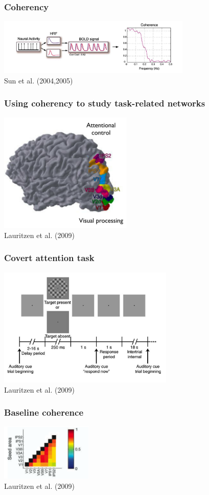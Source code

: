 \documentclass{beamer}
\begin{document}
\begin{frame}
\frametitle{Coherency}
\includegraphics[height=2.7cm]{figures/tseries_w_hemo_w_coh}
\\
\hfill
Sun et al. (2004,2005)
\end{frame}

\begin{frame}
\frametitle{Using coherency to study task-related networks}
\includegraphics[height=5.7cm]{figures/lauritzen1}
\\
\hfill 
Lauritzen et al. (2009)
\end{frame}


\begin{frame}
\frametitle{Covert attention task}
\includegraphics[height=5.7cm]{figures/lauritzen2}
\\
\hfill 
Lauritzen et al. (2009)
\end{frame}

\begin{frame}
\frametitle{Baseline coherence}
\includegraphics[height=2.7cm]{figures/lauritzen3}
\\
\hfill 
Lauritzen et al. (2009)
\end{frame}
\end{document}
